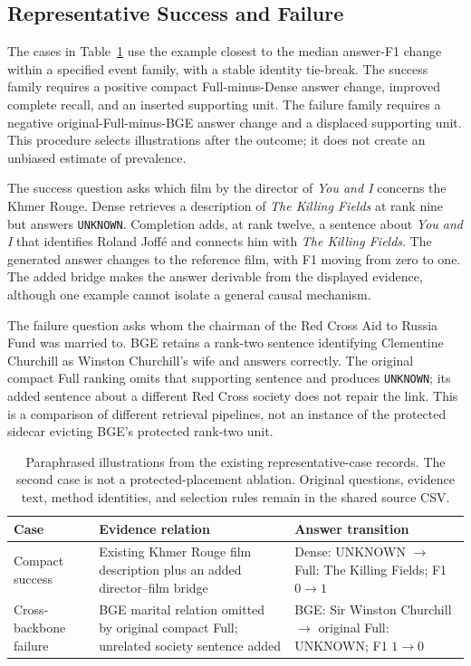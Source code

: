 \documentclass[11pt,a4paper]{article}
\begin{document}
\subsection{Representative Success and Failure}
The cases in Table~\ref{tab:cases} use the example closest to the median
answer-F1 change within a specified event family, with a stable identity
tie-break. The success family requires a positive compact Full-minus-Dense
answer change, improved complete recall, and an inserted supporting unit.
The failure family requires a negative original-Full-minus-BGE answer change
and a displaced supporting unit. This procedure selects illustrations after
the outcome; it does not create an unbiased estimate of prevalence.

The success question asks which film by the director of \emph{You and I}
concerns the Khmer Rouge. Dense retrieves a description of \emph{The Killing
Fields} at rank nine but answers \texttt{UNKNOWN}. Completion adds, at rank
twelve, a sentence about \emph{You and I} that identifies Roland Joff\'e and
connects him with \emph{The Killing Fields}. The generated answer changes to
the reference film, with F1 moving from zero to one.
The added bridge makes the answer derivable from the displayed evidence,
although one example cannot isolate a general causal mechanism.

The failure question asks whom the chairman of the Red Cross Aid to Russia
Fund was married to. BGE retains a rank-two sentence identifying Clementine
Churchill as Winston Churchill's wife and answers correctly. The original
compact Full ranking omits that supporting sentence and produces
\texttt{UNKNOWN}; its added sentence about a different Red Cross society
does not repair the link. This is a comparison of different retrieval
pipelines, not an instance of the protected sidecar evicting BGE's protected
rank-two unit.

\begin{table}[t]
\centering\small
\begin{tabular}{@{}p{}p{}p{}@{}}
\toprule
Case & Evidence relation & Answer transition\\
\midrule
Compact success & Existing Khmer Rouge film description plus an added
director--film bridge & Dense: UNKNOWN $\rightarrow$ Full: The Killing
Fields; F1 $0\rightarrow1$\\
Cross-backbone failure & BGE marital relation omitted by original compact
Full; unrelated society sentence added & BGE: Sir Winston Churchill
$\rightarrow$ original Full: UNKNOWN; F1 $1\rightarrow0$\\
\bottomrule
\end{tabular}
\caption{Paraphrased illustrations from the existing representative-case
records. The second case is not a protected-placement ablation. Original
questions, evidence text, method identities, and selection rules remain in
the shared source CSV.}
\label{tab:cases}
\end{table}
\end{document}
